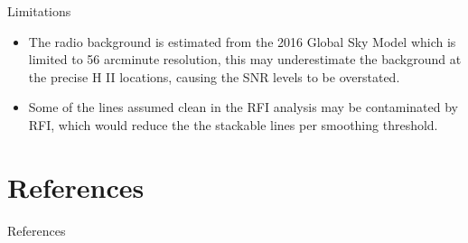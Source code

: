 \documentclass[aspectratio=169]{beamer}
\begin{document}
\begin{frame}{Limitations}
  \begin{itemize}
    \item The radio background is estimated from the 2016 Global Sky Model which is limited to 56 arcminute resolution, this may underestimate the background at the precise H II locations, causing the SNR levels to be overstated.
    \item Some of the lines assumed clean in the RFI analysis may be contaminated by RFI, which would reduce the the stackable lines per smoothing threshold.
  \end{itemize}
\end{frame}

\section*{References}
\begin{frame}[allowframebreaks]{References}
  \footnotesize
  
  
\end{frame}
\end{document}
